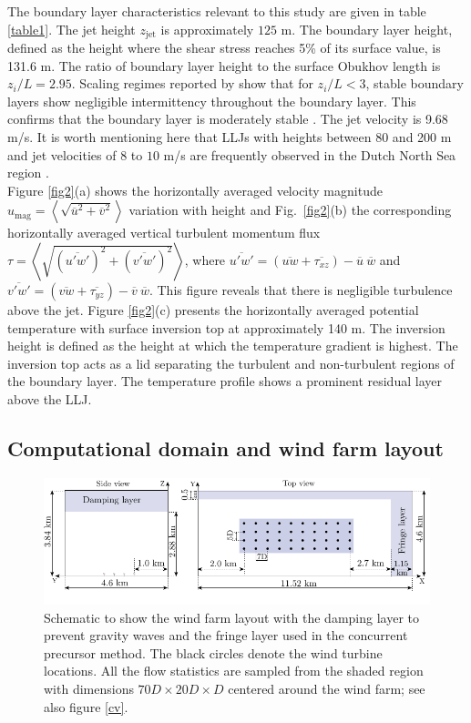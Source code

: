 \documentclass[%
 aip,
 amsmath,amssymb,
reprint,
twocolumn,%
author-numerical,%
]{revtex4-1}
\begin{document}
\indent The boundary layer characteristics relevant to this study are given in table \ref{table1}. {\color{black} The jet height $z_\text{jet}$ is approximately $125$ m. The boundary layer height, defined as the height where the shear stress reaches 5\% of its surface value\cite{bea06}, is 131.6 m. The ratio of boundary layer height to the surface Obukhov length is $z_i/L=2.95$. Scaling regimes reported by \citeauthor{hol86} \cite{hol86} show that for $z_i/L < 3$, stable boundary layers show negligible intermittency throughout the boundary layer. This confirms that the boundary layer is moderately stable \cite{hol86}. The jet velocity is 9.68 m/s. It is worth mentioning here that LLJs with heights between 80 and 200 m and jet velocities of $8$ to $10$ m/s are frequently observed in the Dutch North Sea region \cite{baa09}.}\\
\indent Figure \ref{fig2}(a) shows the horizontally averaged velocity magnitude $u_\text{mag}=\left<\sqrt{\overline{u}^2+\overline{v}^2}\right>$ variation with height and Fig.\ \ref{fig2}(b) the corresponding horizontally averaged vertical turbulent momentum flux $\tau=\left<\sqrt{(\overline{u'w'})^2 + (\overline{v'w'})^2}\right>$, where $\overline{u'w'}=\left(\overline{{uw}} + \overline{\tau_{xz}}\right)-\overline{{u}}~\overline{{w}}$ and $\overline{v'w'}=\left(\overline{{vw}} + \overline{\tau_{yz}}\right)-\overline{{v}}~\overline{{w}}$. {\color{black} This figure reveals that there is negligible turbulence above the jet. Figure \ref{fig2}(c) presents the horizontally averaged potential temperature with surface inversion top at approximately 140 m. The inversion height is defined as the height at which the temperature gradient is highest. The inversion top acts as a lid separating the turbulent and non-turbulent regions of the boundary layer. The temperature profile shows a prominent residual layer above the LLJ.}
\subsection{Computational domain and wind farm layout}\label{sec2.4} 
\begin{figure}[ht!]
	\centering
	\includegraphics[width=\linewidth]{fig3}
	\caption{Schematic to show the wind farm layout with the damping layer to prevent gravity waves and the fringe layer used in the concurrent precursor method. The black circles denote the wind turbine locations. All the flow statistics are sampled from the shaded region with dimensions $70D\times{20D}\times{D}$ centered around the wind farm; see also figure \ref{cv}.}
	\label{fig3}
\end{figure}
\end{document}
